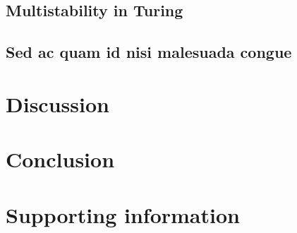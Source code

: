 \documentclass[10pt,letterpaper]{article}
\newlength\savedwidth
\newcommand\thickhline{\noalign{\global\savedwidth\arrayrulewidth\global\arrayrulewidth 2pt}%
\hline
\noalign{\global\arrayrulewidth\savedwidth}}
\begin{document}


\subsection*{Multistability in Turing}


\subsection*{Sed ac quam id nisi malesuada congue}



\section*{Discussion}


\section*{Conclusion}


\section*{Supporting information}

\end{document}
